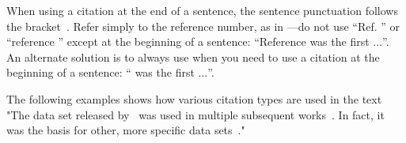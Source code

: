\documentclass[12pt]{uomthesis}
\begin{document}
\begin{table}[!htb]
\end{table}

When using a citation at the end of a sentence, the sentence punctuation follows the bracket~\cite{rajapaksha2021sigmalaw}. Refer simply to the reference number, as in \cite{sugathadasa2018legal}---do not use ``Ref. \cite{sugathadasa2018legal}'' or ``reference \cite{sugathadasa2018legal}'' except at the beginning of a sentence: ``Reference \cite{sugathadasa2018legal} was the first $\ldots$''. An alternate solution is to always use  when you need to use a citation at the beginning of a sentence: ``\citet{sugathadasa2018legal} was the first $\ldots$''.   

The following examples shows how various citation types are used in the text "The data set released by~\citet{sugathadasa2017synergistic} was used in multiple subsequent works~\cite{sugathadasa2018legal,ratnayaka2020effective,jayawardana2017word}. In fact, it was the basis for other, more specific data sets~\cite{rajapaksha2021sigmalaw}."



\begin{references}
\end{references}
\end{document}
